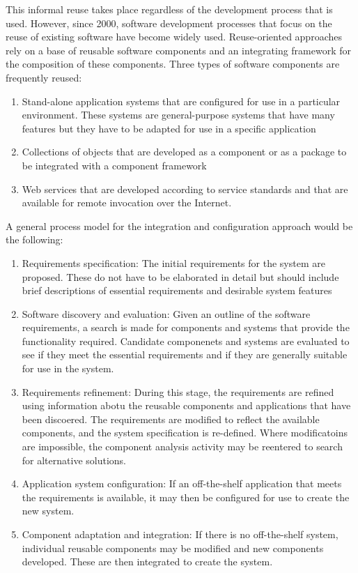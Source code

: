 This informal reuse takes place regardless of the development process that is used. However, since 2000, software development processes that focus on the reuse of existing software have become widely used. Reuse-oriented approaches rely on a base of reusable software components and an integrating framework for the composition of these components. Three types of software components are frequently reused:
\begin{enumerate}
    \item Stand-alone application systems that are configured for use in a particular environment. These systems are general-purpose systems that have many features but they have to be adapted for use in a specific application
    \item Collections of objects that are developed as a component or as a package to be integrated with a component framework
    \item Web services that are developed according to service standards and that are available for remote invocation over the Internet.
\end{enumerate}

A general process model for the integration and configuration approach would be the following:
\begin{enumerate}
    \item Requirements specification: The initial requirements for the system are proposed. These do not have to be elaborated in detail but should include brief descriptions of essential requirements and desirable system features
    \item Software discovery and evaluation: Given an outline of the software requirements, a search is made for components and systems that provide the functionality required. Candidate componenets and systems are evaluated to see if they meet the essential requirements and if they are generally suitable for use in the system.
    \item Requirements refinement: During this stage, the requirements are refined using information abotu the reusable components and applications that have been discoered. The requirements are modified to reflect the available components, and the system specification is re-defined. Where modificatoins are impossible, the component analysis activity may be reentered to search for alternative solutions.
    \item Application system configuration: If an off-the-shelf application that meets the requirements is available, it may then be configured for use to create the new system.
    \item Component adaptation and integration: If there is no off-the-shelf system, individual reusable components may be modified and new components developed. These are then integrated to create the system.
\end{enumerate}

